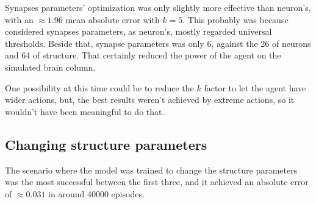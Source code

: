 Synapses parameters' optimization was only slightly more effective than neuron's, with an $\approx 1.96$ mean absolute error with $k = 5$. This probably was because considered synapses parameters, as neuron's, mostly regarded universal thresholds. Beside that, synapse parameters was only 6, against the 26 of neurons and 64 of structure. That certainly reduced the power of the agent on the simulated brain column.

One possibility at this time could be to reduce the $k$ factor to let the agent have wider actions, but,  the best results weren't achieved by extreme actions, so it wouldn't have been meaningful to do that.

\subsection{Changing structure parameters} 

The scenario where the model was trained to change the structure parameters was the most successful between the first three, and it achieved an absolute error of $\approx 0.031$ in around 40000 episodes. 

